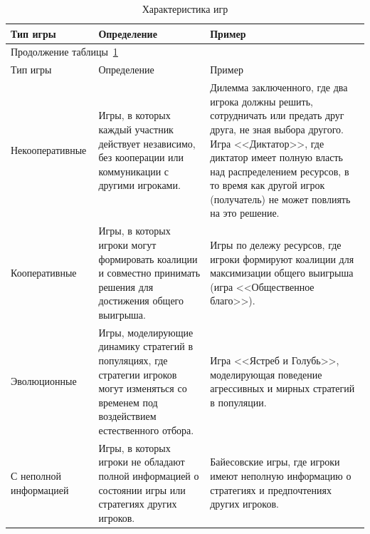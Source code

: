 \begin{longtable}[c]{|p{}|p{}|p{}|}
    \caption{Характеристика игр}\label{gamechar}
    \\
    \hline
    Тип игры & Определение & Пример             \\ \hline

    \endfirsthead  
    \multicolumn{3}{l}{\hspace{-2mm}Продолжение таблицы~\ref{gamechar}}        \\ %
 \hline
    Тип игры & Определение & Пример             \\ \hline
    \hline \endhead  

    \endfoot        \hline
    \endlastfoot
Неко\-о\-пе\-ра\-тив\-ные & Игры, в которых каждый участник действует независимо, без кооперации или коммуникации с другими игроками. & Дилемма заключенного, где два игрока должны решить, сотрудничать или предать друг друга, не зная выбора другого. Игра <<Диктатор>>, где диктатор имеет полную власть над распределением ресурсов, в то время как другой игрок (получатель) не может повлиять на это решение.  \\
\hline
Ко\-о\-пе\-ра\-тив\-ны\-е  & Игры, в которых игроки могут формировать коалиции и совместно принимать решения для достижения общего выигрыша. & Игры по дележу ресурсов, где игроки формируют коалиции для максимизации общего выигрыша (игра <<Общественное благо>>). \\ \hline

Э\-во\-лю\-ци\-он\-ные & Игры, моделирующие динамику стратегий в популяциях, где стратегии игроков могут изменяться со временем под воздействием естественного отбора. &  Игра <<Ястреб и Голубь>>, моделирующая поведение агрессивных и мирных стратегий в популяции. \\ \hline

С непол\-ной ин\-фор\-мац\-и\-ей & Игры, в которых игроки не обладают полной информацией о состоянии игры или стратегиях других игроков. & Байесовские игры, где игроки имеют неполную информацию о стратегиях и предпочтениях других игроков. \\ \hline


\end{longtable}
